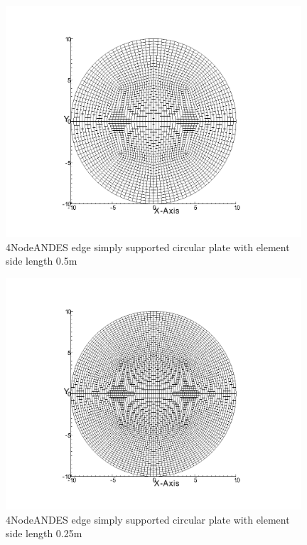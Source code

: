 \documentclass[fleqn,11pt,letter]{article}
\begin{document}
\begin{figure}[H]
  \centering
  \includegraphics[width=11cm]{../Figure_files/4NodeANDES/circular_plate5.png}
  \caption{4NodeANDES edge simply supported circular plate with element side length 0.5m }
  \label{fig 4NodeANDES edges simply supported circular plate with element side length 0.5m }
\end{figure}

\newpage

\begin{figure}[H]
  \centering
  \includegraphics[width=11cm]{../Figure_files/4NodeANDES/circular_plate6.png}
  \caption{4NodeANDES edge simply supported circular plate with element side length 0.25m }
  \label{fig 4NodeANDES edges simply supported circular plate with element side length 0.25m }
\end{figure}
\end{document}
